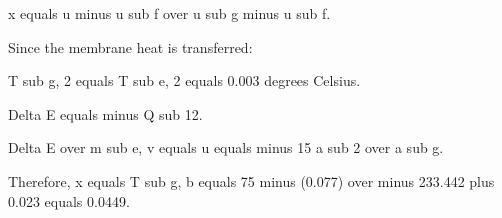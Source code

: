 x equals u minus u sub f over u sub g minus u sub f.

Since the membrane heat is transferred:

T sub g, 2 equals T sub e, 2 equals 0.003 degrees Celsius.

Delta E equals minus Q sub 12.

Delta E over m sub e, v equals u equals minus 15 a sub 2 over a sub g.

Therefore, x equals T sub g, b equals 75 minus (0.077) over minus 233.442 plus 0.023 equals 0.0449.